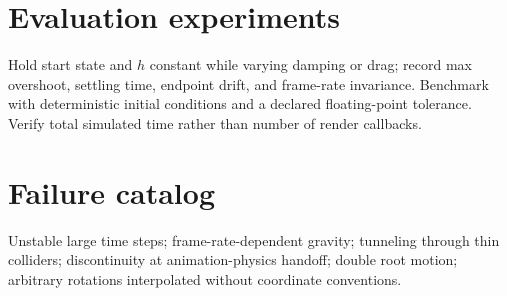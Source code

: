 \documentclass[10pt,letterpaper]{article}
\begin{document}
\section{Evaluation experiments}
Hold start state and $h$ constant while varying damping or drag; record max overshoot, settling time, endpoint drift, and frame-rate invariance. Benchmark with deterministic initial conditions and a declared floating-point tolerance. Verify total simulated time rather than number of render callbacks.
\section{Failure catalog}
Unstable large time steps; frame-rate-dependent gravity; tunneling through thin colliders; discontinuity at animation-physics handoff; double root motion; arbitrary rotations interpolated without coordinate conventions.
\end{document}
